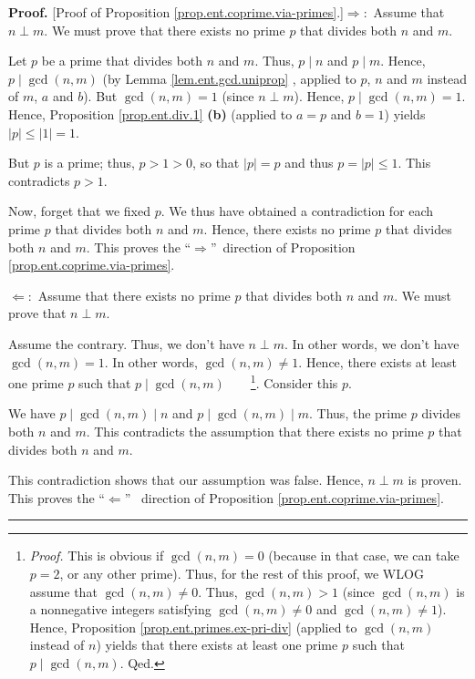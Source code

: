 \documentclass[numbers=enddot,12pt,final,onecolumn,notitlepage]{scrartcl}%
\numberwithin{exer}{subsection}
\theoremstyle{definition}
\newenvironment{proof}[1][Proof]{\noindent\textbf{#1.} }{\ \rule{0.5em}{0.5em}}
\begin{document}
\begin{proof}
[Proof of Proposition \ref{prop.ent.coprime.via-primes}.]$\Longrightarrow:$
Assume that $n\perp m$. We must prove that there exists no prime $p$ that
divides both $n$ and $m$.

Let $p$ be a prime that divides both $n$ and $m$. Thus, $p\mid n$ and $p\mid
m$. Hence, $p\mid\gcd\left(  n,m\right)  $ (by Lemma \ref{lem.ent.gcd.uniprop}%
, applied to $p$, $n$ and $m$ instead of $m$, $a$ and $b$). But $\gcd\left(
n,m\right)  =1$ (since $n\perp m$). Hence, $p\mid\gcd\left(  n,m\right)  =1$.
Hence, Proposition \ref{prop.ent.div.1} \textbf{(b)} (applied to $a=p$ and
$b=1$) yields $\left\vert p\right\vert \leq\left\vert 1\right\vert =1$.

But $p$ is a prime; thus, $p>1>0$, so that $\left\vert p\right\vert =p$ and
thus $p=\left\vert p\right\vert \leq1$. This contradicts $p>1$.

Now, forget that we fixed $p$. We thus have obtained a contradiction for each
prime $p$ that divides both $n$ and $m$. Hence, there exists no prime $p$ that
divides both $n$ and $m$. This proves the \textquotedblleft$\Longrightarrow
$\textquotedblright\ direction of Proposition
\ref{prop.ent.coprime.via-primes}.

$\Longleftarrow:$ Assume that there exists no prime $p$ that divides both $n$
and $m$. We must prove that $n\perp m$.

Assume the contrary. Thus, we don't have $n\perp m$. In other words, we don't
have $\gcd\left(  n,m\right)  =1$. In other words, $\gcd\left(  n,m\right)
\neq1$. Hence, there exists at least one prime $p$ such that $p\mid\gcd\left(
n,m\right)  $\ \ \ \ \footnote{\textit{Proof.} This is obvious if $\gcd\left(
n,m\right)  =0$ (because in that case, we can take $p=2$, or any other prime).
Thus, for the rest of this proof, we WLOG assume that $\gcd\left(  n,m\right)
\neq0$. Thus, $\gcd\left(  n,m\right)  >1$ (since $\gcd\left(  n,m\right)  $
is a nonnegative integers satisfying $\gcd\left(  n,m\right)  \neq0$ and
$\gcd\left(  n,m\right)  \neq1$). Hence, Proposition
\ref{prop.ent.primes.ex-pri-div} (applied to $\gcd\left(  n,m\right)  $
instead of $n$) yields that there exists at least one prime $p$ such that
$p\mid\gcd\left(  n,m\right)  $. Qed.}. Consider this $p$.

We have $p\mid\gcd\left(  n,m\right)  \mid n$ and $p\mid\gcd\left(
n,m\right)  \mid m$. Thus, the prime $p$ divides both $n$ and $m$. This
contradicts the assumption that there exists no prime $p$ that divides both
$n$ and $m$.

This contradiction shows that our assumption was false. Hence, $n\perp m$ is
proven. This proves the \textquotedblleft$\Longleftarrow$\textquotedblright%
\ direction of Proposition \ref{prop.ent.coprime.via-primes}.
\end{proof}
\end{document}
